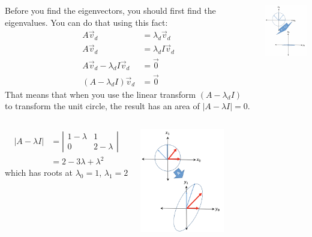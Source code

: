 \documentclass{beamer}
\begin{document}
\begin{frame}
  \begin{columns}[t]
    \column{2.75in}
    \begin{block}{}
      Before you find the eigenvectors, you should first find
      the eigenvalues.  You can do that using this fact:
      \begin{align*}
        A\vec{v}_d &= \lambda_d\vec{v}_d\\
        A\vec{v}_d &= \lambda_d I\vec{v}_d\\
        A\vec{v}_d-\lambda_d I\vec{v}_d &=\vec{0}\\
        (A-\lambda_d I)\vec{v}_d &= \vec{0}
      \end{align*}
      That means that when you use the linear transform
      $(A-\lambda_d I)$ to transform the unit circle, the result has an
      area of $|A-\lambda I|=0$.
    \end{block}
    \column{1.5in}
    \begin{block}{}
      \includegraphics[width=1.45in]{linalg_review_fig3.png}
    \end{block}
  \end{columns}
\end{frame}

\begin{frame}
  \begin{columns}[t]
    \column{2.75in}
    \begin{block}{}
      \begin{align*}
        |A-\lambda I| &=
        \left|\begin{array}{cc}1-\lambda&1\\0&2-\lambda\end{array}\right|\\
        &=2-3\lambda+\lambda^2
      \end{align*}
      which has roots at $\lambda_0=1$, $\lambda_1=2$
    \end{block}
    \column{1.5in}
    \begin{block}{}
      \includegraphics[width=1.45in]{linalg_review_fig2.png}
    \end{block}
  \end{columns}
\end{frame}
\end{document}
